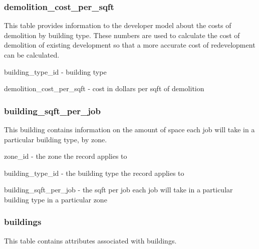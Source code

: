 \subsubsection{demolition\_cost\_per\_sqft} 

This table provides information to the developer model about the costs of demolition by building type. These numbers are used to calculate the cost of demolition of existing development so that a more accurate cost of redevelopment can be calculated.

\begin{description}
\item building\_type\_id - building type
\item demolition\_cost\_per\_sqft - cost in dollars per sqft of demolition 
\end{description}

\subsubsection{building\_sqft\_per\_job} 

This building contains information on the amount of space each job will take in a particular building type, by zone.

\begin{description}
\item zone\_id - the zone the record applies to
\item building\_type\_id - the building type the record applies to
\item building\_sqft\_per\_job - the sqft per job each job will take in a particular building type in a particular zone 
\end{description}

\subsubsection{buildings} 

This table contains attributes associated with buildings.

